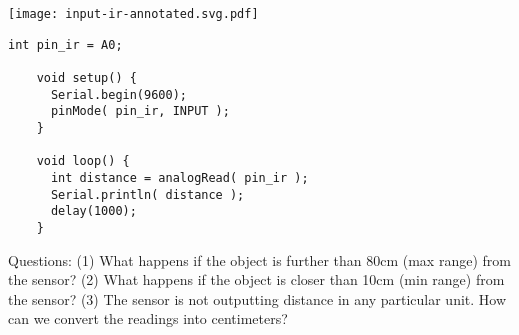 \vspace{0.1in}
\begin{minipage}[t]{0.49\tw}
  \vspace{0pt}

  \texttt{[image: input-ir-annotated.svg.pdf]}
\end{minipage}
\hfill
\begin{minipage}[t]{0.49\tw}
  \vspace{0.1in}
  \begin{Verbatim}[gobble=3,fontsize=\small]
    int pin_ir = A0;

    void setup() {
      Serial.begin(9600);
      pinMode( pin_ir, INPUT );
    }

    void loop() {
      int distance = analogRead( pin_ir );
      Serial.println( distance );
      delay(1000);
    }
  \end{Verbatim}
\end{minipage}
\vspace{0.1in}

Questions: (1) What happens if the object is further than 80cm (max
range) from the sensor? (2) What happens if the object is closer than
10cm (min range) from the sensor? (3) The sensor is not outputting
distance in any particular unit. How can we convert the readings into
centimeters?

